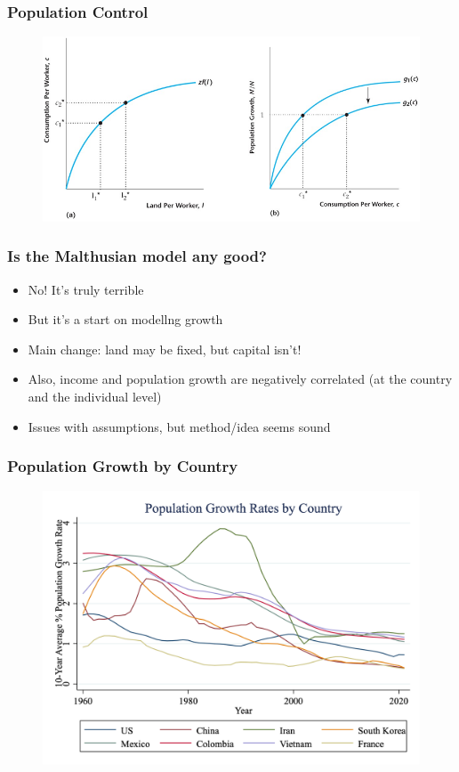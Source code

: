 \documentclass{beamer}
\begin{document}
\begin{frame}
\frametitle[alignment=center]{Population Control}
\begin{figure}
\centering
\includegraphics[scale=0.5]{Figures/W_Fig_7pt11.png}
\end{figure}
\end{frame}


\begin{frame}
\frametitle[alignment=center]{Is the Malthusian model any good?}
\begin{itemize}
\item No!  It's truly terrible
\bigskip
\item But it's a start on modellng growth
\bigskip
\item Main change:  land may be fixed, but capital isn't!  
\bigskip
\item Also, income and population growth are negatively correlated (at the country and the individual level)
\bigskip
\item Issues with assumptions, but method/idea seems sound
\end{itemize}
\end{frame}

\begin{frame}
\frametitle[alignment=center]{Population Growth by Country}
\begin{figure}
\centering
\includegraphics[scale=0.25]{Figures/PopGrowth_country.png}
\end{figure}
\end{frame}
\end{document}
